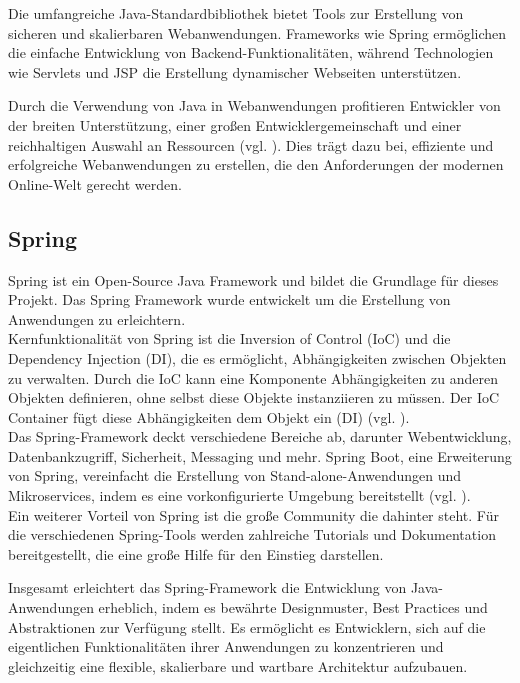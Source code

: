 \documentclass[fontsize=12pt,openright,oneside,paper=a4,BCOR=1cm]{scrbook}
\begin{document}
Die umfangreiche Java-Standardbibliothek bietet Tools zur Erstellung von sicheren und skalierbaren Webanwendungen. Frameworks wie Spring ermöglichen die einfache Entwicklung von Backend-Funktionalitäten, während Technologien wie Servlets und JSP die Erstellung dynamischer Webseiten unterstützen.

Durch die Verwendung von Java in Webanwendungen profitieren Entwickler von der breiten Unterstützung, einer großen Entwicklergemeinschaft und einer reichhaltigen Auswahl an Ressourcen (vgl. \cite{scalosoftjava}). Dies trägt dazu bei, effiziente und erfolgreiche Webanwendungen zu erstellen, die den Anforderungen der modernen Online-Welt gerecht werden.

\subsection{Spring}

Spring ist ein Open-Source Java Framework und bildet die Grundlage für dieses Projekt. Das Spring Framework wurde entwickelt um die Erstellung von Anwendungen zu erleichtern. \\
Kernfunktionalität von Spring ist die Inversion of Control (IoC) und die Dependency Injection (DI), die es ermöglicht, Abhängigkeiten zwischen Objekten zu verwalten. Durch die IoC kann eine Komponente Abhängigkeiten zu anderen Objekten definieren, ohne selbst diese Objekte instanziieren zu müssen. Der IoC Container fügt diese Abhängigkeiten dem Objekt ein (DI) (vgl. \cite{springioc}). \\
Das Spring-Framework deckt verschiedene Bereiche ab, darunter Webentwicklung, Datenbankzugriff, Sicherheit, Messaging und mehr. Spring Boot, eine Erweiterung von Spring, vereinfacht die Erstellung von Stand-alone-Anwendungen und Mikroservices, indem es eine vorkonfigurierte Umgebung bereitstellt (vgl. \cite{springboot}). \\
Ein weiterer Vorteil von Spring ist die große Community die dahinter steht. Für die verschiedenen Spring-Tools werden zahlreiche Tutorials und Dokumentation bereitgestellt, die eine große Hilfe für den Einstieg darstellen. 

Insgesamt erleichtert das Spring-Framework die Entwicklung von Java-Anwendungen erheblich, indem es bewährte Designmuster, Best Practices und Abstraktionen zur Verfügung stellt. Es ermöglicht es Entwicklern, sich auf die eigentlichen Funktionalitäten ihrer Anwendungen zu konzentrieren und gleichzeitig eine flexible, skalierbare und wartbare Architektur aufzubauen.
\end{document}

